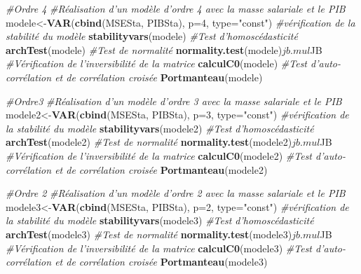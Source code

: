 \documentclass[11pt,]{article}
\newenvironment{Shaded}{\begin{snugshade}}{\end{snugshade}}
\newcommand{\KeywordTok}[1]{\textcolor[rgb]{0.13,0.29,0.53}{\textbf{{#1}}}}
\newcommand{\DataTypeTok}[1]{\textcolor[rgb]{0.13,0.29,0.53}{{#1}}}
\newcommand{\DecValTok}[1]{\textcolor[rgb]{0.00,0.00,0.81}{{#1}}}
\newcommand{\StringTok}[1]{\textcolor[rgb]{0.31,0.60,0.02}{{#1}}}
\newcommand{\CommentTok}[1]{\textcolor[rgb]{0.56,0.35,0.01}{\textit{{#1}}}}
\newcommand{\NormalTok}[1]{{#1}}
\begin{document}
\begin{Shaded}
\begin{Highlighting}[]
{\CommentTok{#Ordre 4}
\CommentTok{#Réalisation d'un modèle d'ordre 4 avec la masse salariale et le PIB}
\NormalTok{modele<-}\KeywordTok{VAR}\NormalTok{(}\KeywordTok{cbind}\NormalTok{(MSESta, PIBSta), }\DataTypeTok{p=}\DecValTok{4}\NormalTok{, }\DataTypeTok{type=}\StringTok{"const"}\NormalTok{)}
\CommentTok{#vérification de la stabilité du modèle}
\KeywordTok{stabilityvars}\NormalTok{(modele)}
\CommentTok{#Test d'homoscédasticité}
\KeywordTok{archTest}\NormalTok{(modele)}
\CommentTok{#Test de normalité}
\KeywordTok{normality.test}\NormalTok{(modele)$jb.mul$JB}
\CommentTok{#Vérification de l'inversibilité de la matrice}
\KeywordTok{calculC0}\NormalTok{(modele)}
\CommentTok{#Test d'auto-corrélation et de corrélation croisée}
\KeywordTok{Portmanteau}\NormalTok{(modele)}

\CommentTok{#Ordre3}
\CommentTok{#Réalisation d'un modèle d'ordre 3 avec la masse salariale et le PIB}
\NormalTok{modele2<-}\KeywordTok{VAR}\NormalTok{(}\KeywordTok{cbind}\NormalTok{(MSESta, PIBSta), }\DataTypeTok{p=}\DecValTok{3}\NormalTok{, }\DataTypeTok{type=}\StringTok{"const"}\NormalTok{)}
\CommentTok{#vérification de la stabilité du modèle}
\KeywordTok{stabilityvars}\NormalTok{(modele2)}
\CommentTok{#Test d'homoscédasticité}
\KeywordTok{archTest}\NormalTok{(modele2)}
\CommentTok{#Test de normalité}
\KeywordTok{normality.test}\NormalTok{(modele2)$jb.mul$JB}
\CommentTok{#Vérification de l'inversibilité de la matrice}
\KeywordTok{calculC0}\NormalTok{(modele2)}
\CommentTok{#Test d'auto-corrélation et de corrélation croisée}
\KeywordTok{Portmanteau}\NormalTok{(modele2)}

\CommentTok{#Ordre 2}
\CommentTok{#Réalisation d'un modèle d'ordre 2 avec la masse salariale et le PIB}
\NormalTok{modele3<-}\KeywordTok{VAR}\NormalTok{(}\KeywordTok{cbind}\NormalTok{(MSESta, PIBSta), }\DataTypeTok{p=}\DecValTok{2}\NormalTok{, }\DataTypeTok{type=}\StringTok{"const"}\NormalTok{)}
\CommentTok{#vérification de la stabilité du modèle}
\KeywordTok{stabilityvars}\NormalTok{(modele3)}
\CommentTok{#Test d'homoscédasticité}
\KeywordTok{archTest}\NormalTok{(modele3)}
\CommentTok{#Test de normalité}
\KeywordTok{normality.test}\NormalTok{(modele3)$jb.mul$JB}
\CommentTok{#Vérification de l'inversibilité de la matrice}
\KeywordTok{calculC0}\NormalTok{(modele3)}
\CommentTok{#Test d'auto-corrélation et de corrélation croisée}
\KeywordTok{Portmanteau}\NormalTok{(modele3)}

}
\end{Highlighting}
\end{Shaded}
\end{document}
